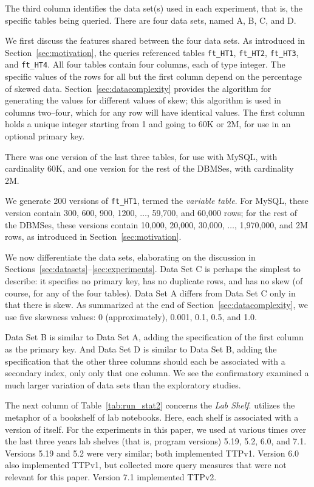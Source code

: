 \documentclass[prodmode,acmtods]{acmsmall}
\def\azdb{\doubleblind{\hbox{\sc AZDBLab}}{\hbox{\sc DBLab}}}
\begin{document}
The third column identifies the data set(s) used in each experiment, that is, the
specific tables being queried. There are four data sets, named A, B, C, and
D.

We first discuss the features shared between the four data sets. As
introduced in Section~\ref{sec:motivation}, the queries referenced tables
{\tt ft\_HT1}, {\tt ft\_HT2}, {\tt ft\_HT3}, and {\tt ft\_HT4}. All four
tables contain four columns, each of type integer. The specific values of
the rows for all but the first column depend
on the percentage of skewed data. Section~\ref{sec:datacomplexity} provides
the algorithm for generating the values for different values of skew; this
algorithm is used in columns two--four, which for any row will have
identical values. The first column holds a unique integer starting from 1
and going to 60K or 2M, for use in an optional primary key.

There was one version of the
last three tables, for use with MySQL, with cardinality 60K, and one version
for the rest of the DBMSes, with cardinality 2M.

We generate 200 versions of {\tt ft\_HT1}, termed the {\em variable table}. For MySQL, these version contain
300, 600, 900, 1200, $\ldots$, 59,700, and 60,000 rows; for the rest of the
DBMSes, these versions contain 10,000, 20,000, 30,000, $\ldots$, 1,970,000,
and 2M rows, as introduced in Section~\ref{sec:motivation}.

We now differentiate the data sets, elaborating on the discussion in Sections~\ref{sec:datasets}--\ref{sec:experiments}. Data Set C is perhaps the simplest to
describe: it specifies no primary key, has no duplicate rows, and has no skew
(of course, for any of the four tables). Data Set A differs from Data Set C
only in that there is skew.  As summarized at the end of
Section~\ref{sec:datacomplexity}, we use five skewness values: 0
(approximately), 0.001, 0.1, 0.5, and 1.0.

Data Set B is similar to Data Set A, adding the specification of the first
column as the primary key. And Data Set D is similar to Data Set B, adding
the specification that the other three columns should each be associated
with a secondary index, only only that one column.
We see the confirmatory examined a much larger variation of data sets than
the exploratory studies.

The next column of Table~\ref{tab:run_stat2} concerns the {\em Lab
  Shelf}. \hbox{\azdb} utilizes the metaphor of a bookshelf of lab
notebooks. Here, each shelf is associated with a version of \hbox{\azdb} itself. For the experiments in this paper, we used at various times over
the last three years lab shelves (that is, program versions) 5.19, 5.2,
6.0, and 7.1. Versions 5.19 and 5.2 were very similar; both implemented
TTPv1.  Version 6.0 also implemented TTPv1, but collected more query
measures that were not relevant for this paper. Version 7.1 implemented
TTPv2.
\end{document}
